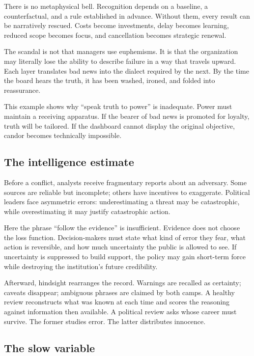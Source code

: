 ﻿\documentclass[12pt,a4paper]{book}
\begin{document}
There is no metaphysical bell. Recognition depends on a baseline, a counterfactual, and a rule established in advance. Without them, every result can be narratively rescued. Costs become investments, delay becomes learning, reduced scope becomes focus, and cancellation becomes strategic renewal.

The scandal is not that managers use euphemisms. It is that the organization may literally lose the ability to describe failure in a way that travels upward. Each layer translates bad news into the dialect required by the next. By the time the board hears the truth, it has been washed, ironed, and folded into reassurance.

This example shows why “speak truth to power” is inadequate. Power must maintain a receiving apparatus. If the bearer of bad news is promoted for loyalty, truth will be tailored. If the dashboard cannot display the original objective, candor becomes technically impossible.

\subsection{The intelligence estimate}

Before a conflict, analysts receive fragmentary reports about an adversary. Some sources are reliable but incomplete; others have incentives to exaggerate. Political leaders face asymmetric errors: underestimating a threat may be catastrophic, while overestimating it may justify catastrophic action.

Here the phrase “follow the evidence” is insufficient. Evidence does not choose the loss function. Decision-makers must state what kind of error they fear, what action is reversible, and how much uncertainty the public is allowed to see. If uncertainty is suppressed to build support, the policy may gain short-term force while destroying the institution's future credibility.

Afterward, hindsight rearranges the record. Warnings are recalled as certainty; caveats disappear; ambiguous phrases are claimed by both camps. A healthy review reconstructs what was known at each time and scores the reasoning against information then available. A political review asks whose career must survive. The former studies error. The latter distributes innocence.

\subsection{The slow variable}
\end{document}
